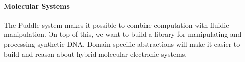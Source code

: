 \documentclass[
  10pt,
  a4paper,
  twocolumn,
]{article}
\begin{document}
\paragraph{Molecular Systems}
The Puddle system makes it possible to combine computation with fluidic manipulation.
On top of this, we want to build a library for manipulating and processing synthetic DNA.
Domain-specific abstractions will make it easier to build and reason about hybrid molecular-electronic systems.







\vfill

\renewcommand*{\bibfont}{\tiny}
\printbibliography[heading=none]
\end{document}
